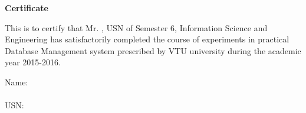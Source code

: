 
\textbf{\Huge Certificate}\\[1in]

\begin{flushleft}
{\large
    This is to certify that Mr. , USN  of Semester 6, Information Science and Engineering has
satisfactorily completed the course of experiments in practical Database Management system
prescribed by VTU university during the academic year 2015-2016.\\[1in]}
\end{flushleft}


\begin{flushleft}
{\large
    Name:  \\~\\
    USN:  \\~\\
}
\end{flushleft}
